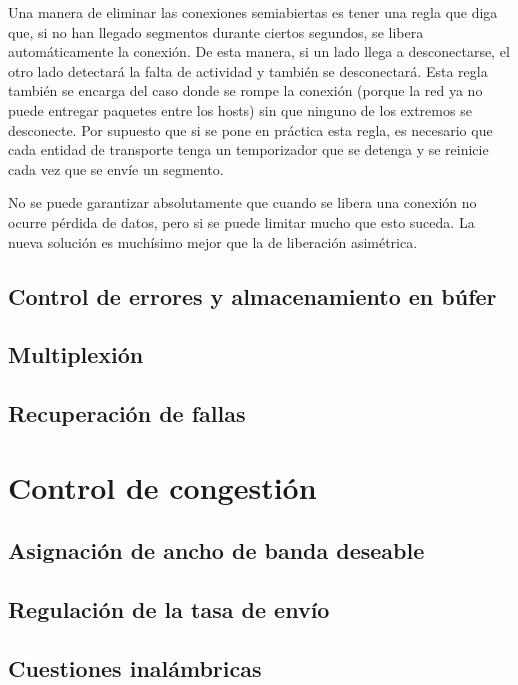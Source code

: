 \documentclass[10pt,a4paper]{report}
\begin{document}
	\par Una manera de eliminar las conexiones semiabiertas es tener una regla que diga que, si no han llegado segmentos durante ciertos segundos, se libera automáticamente la conexión. De esta manera, si un lado llega a desconectarse, el otro lado detectará la falta de actividad y también se desconectará. Esta regla también se encarga del caso donde se rompe la conexión (porque la red ya no puede entregar paquetes entre los hosts) sin que ninguno de los extremos se desconecte. Por supuesto que si se pone en práctica esta regla, es necesario que cada entidad de transporte tenga un temporizador que se detenga y se reinicie cada vez que se envíe un segmento.

	\par No se puede garantizar absolutamente que cuando se libera una conexión no ocurre pérdida de datos, pero si se puede limitar mucho que esto suceda. La nueva solución es muchísimo mejor que la de liberación asimétrica.

\subsection{Control de errores y almacenamiento en búfer}


\subsection{Multiplexión}
\subsection{Recuperación de fallas}


\section{Control de congestión}



\subsection{Asignación de ancho de banda deseable }
\subsection{Regulación de la tasa de envío}
\subsection{Cuestiones inalámbricas}
\end{document}
